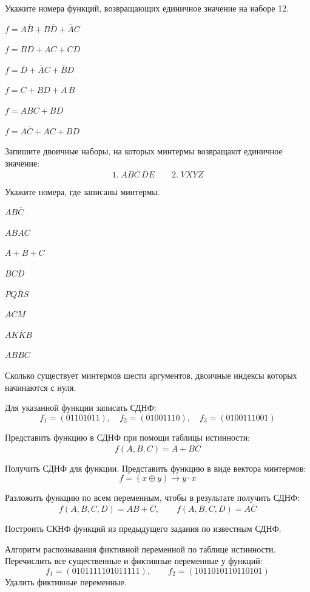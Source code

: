 \documentclass[a4paper,12pt,oneside]{article}
\begin{document}
Укажите номера функций, возвращающих единичное значение на наборе 12.
\begin{numlist}
    \item $f=A\overline{B}+B\overline{D}+\overline{A}C$
    \item $f=BD+AC+CD$
    \item $f=\overline{D}+\overline{A}C+\overline{B}D$
    \item $f=\overline{C}+BD+\overline{A}\,\overline{B}$
    \item $f=ABC+BD$
    \item $f=A\overline{C}+AC+BD$
\end{numlist}

Запишите двоичные наборы, на которых минтермы возвращают единичное значение:
\[
1.\; AB\overline{C}\,\overline{D}E
\qquad
2.\; VX\overline{Y}Z
\]

Укажите номера, где записаны минтермы.
\begin{numlist}
    \item $AB\overline{C}$
    \item $ABAC$
    \item $A+\overline{B}+C$
    \item $BC\overline{D}$
    \item $PQ\overline{R}S$
    \item $ACM$
    \item $AK\overline{K}B$
    \item $ABBC$
\end{numlist}

Сколько существует минтермов шести аргументов, двоичные индексы которых начинаются с нуля.

Для указанной функции записать СДНФ:
\[
f_1=(01101011),\quad f_2=(01001110),\quad f_3=(0100111001)
\]

\clearpage

Представить функцию в СДНФ при помощи таблицы истинности:
\[
f(A,B,C)=\overline{A}+B\overline{C}
\]

Получить СДНФ для функции. Представить функцию в виде вектора минтермов:
\[
f=(x\oplus y)\to y\cdot x
\]

Разложить функцию по всем переменным, чтобы в результате получить СДНФ:
\[
f(A,B,C,D)=AB+\overline{C},\qquad f(A,B,C,D)=A\overline{C}
\]

Построить СКНФ функций из предыдущего задания по известным СДНФ.

Алгоритм распознавания фиктивной переменной по таблице истинности. Перечислить все существенные и фиктивные переменные у функций:
\[
f_1=(0101111101011111),\qquad f_2=(1011010110110101)
\]
Удалить фиктивные переменные.
\end{document}
